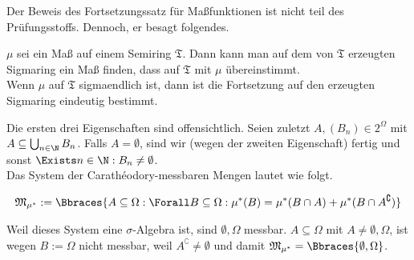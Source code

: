 \begin{solution}
\begin{itemize}
\end{itemize}

Der Beweis des Fortsetzungssatz für Maßfunktionen ist nicht teil des Prüfungsstoffs. Dennoch, er besagt folgendes.

\begin{theorem*}

$\mu$ sei ein Maß auf einem Semiring $\mathfrak{T}$. Dann kann man auf dem von $\mathfrak{T}$ erzeugten Sigmaring ein Maß finden, dass auf $\mathfrak{T}$ mit $\mu$ übereinstimmt. \\
Wenn $\mu$ auf $\mathfrak{T}$ sigmaendlich ist, dann ist die Fortsetzung auf den erzeugten Sigmaring eindeutig bestimmt.

\end{theorem*}

Die ersten drei Eigenschaften sind offensichtlich. Seien zuletzt $A, (B_n) \in 2^\Omega$ mit $A \subseteq \bigcup_{n \in \N} B_n$. Falls $A = \emptyset$, sind wir (wegen der zweiten Eigenschaft) fertig und sonst $\Exists n \in \N: B_n \neq \emptyset$. \\

Das System der Carathéodory-messbaren Mengen lautet wie folgt.

\begin{align*}
  \mathfrak{M}_{\mu^\ast} :=
  \Bbraces
  {
    A \subseteq \Omega:
    \Forall B \subseteq \Omega:
    \mu^\ast(B) = \mu^\ast(B \cap A) + \mu^\ast(B \cap A^\complement)
  }
\end{align*}

Weil dieses System eine $\sigma$-Algebra ist, sind $\emptyset, \Omega$ messbar. $A \subseteq \Omega$ mit $A \neq \emptyset, \Omega$, ist wegen $B := \Omega$ nicht messbar, weil $A^\complement \neq \emptyset$ und damit $\mathfrak{M}_{\mu^\ast} = \Bbraces{\emptyset, \Omega}$.

\end{solution}

